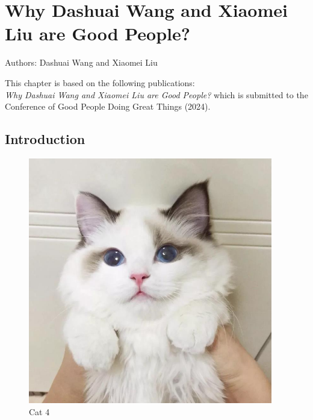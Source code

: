 \chapter{Why Dashuai Wang and Xiaomei Liu are Good People?}

\vspace*{\fill}
	\begin{center}
		Authors: Dashuai Wang and Xiaomei Liu
	\end{center}
\vspace*{\fill}


\vfill
\begin{center}
	This chapter is based on the following publications:\\ \textit{Why Dashuai Wang and Xiaomei Liu are Good People?} \citep{wang_2024} which is submitted to the Conference of Good People Doing Great Things (2024).
\end{center}

\newpage

\section{Introduction}

\begin{figure}[h]
	\centering
	\includegraphics[width=0.95\textwidth]{chapter-3/images/fig4}
	\caption{Cat 4}
\end{figure}